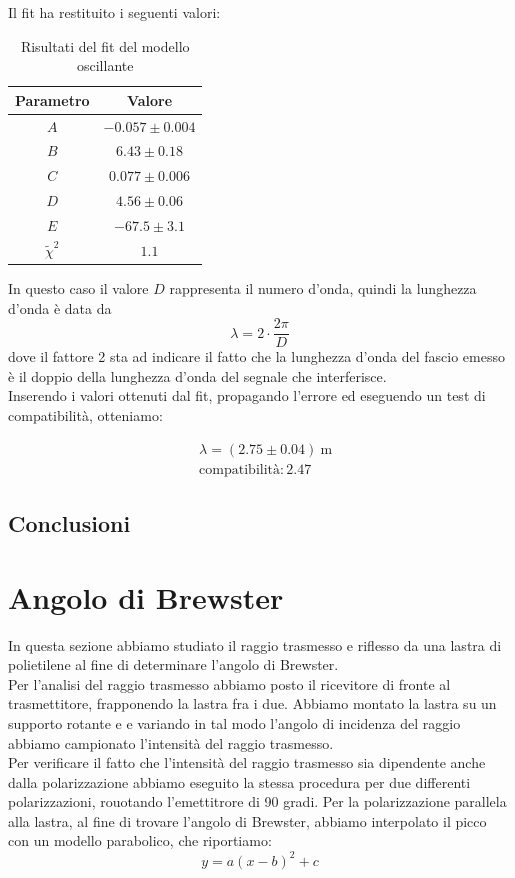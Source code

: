 \documentclass[letterpaper,12pt]{article}
\begin{document}
Il fit ha restituito i seguenti valori:
\begin{table}[h!]
	\centering
	\begin{tabular}{|c|c|}
		\hline
		Parametro & Valore \\
		\hline
		$A$ & $-0.057 \pm 0.004$ \\
		$B$ & $6.43 \pm 0.18$ \\
		$C$ & $0.077 \pm 0.006$ \\
		$D$ & $4.56 \pm 0.06$ \\
		$E$ & $-67.5 \pm 3.1$ \\
		$\tilde\chi^2$ & $1.1$ \\
		\hline
	\end{tabular}
	\caption{Risultati del fit del modello oscillante}
	\label{tab:fit_distanza_ondulatori}
\end{table}

In questo caso il valore $D$ rappresenta il numero d'onda, quindi la lunghezza d'onda è data da
$$\lambda = 2\cdot \frac{2\pi}{D}$$
dove il fattore 2 sta ad indicare il fatto che la lunghezza d'onda del fascio emesso è il doppio della lunghezza d'onda del segnale che interferisce.\\
Inserendo i valori ottenuti dal fit, propagando l'errore ed eseguendo un test di compatibilità, otteniamo:

\begin{align*}
	 & \lambda = (2.75 \pm 0.04)\ \text{m} \\
	 & \text{compatibilità}: 2.47
\end{align*}

\subsection{Conclusioni}



\section{Angolo di Brewster}
In questa sezione abbiamo studiato il raggio trasmesso e riflesso da una lastra di polietilene al fine di determinare
l'angolo di Brewster.\\
Per l'analisi del raggio trasmesso abbiamo posto il ricevitore di fronte al trasmettitore, frapponendo la lastra
fra i due. Abbiamo montato la lastra su un supporto rotante e e variando in tal modo l'angolo di incidenza del raggio
abbiamo campionato l'intensità del raggio trasmesso.\\
Per verificare il fatto che l'intensità del raggio trasmesso sia dipendente anche dalla polarizzazione abbiamo
eseguito la stessa procedura per due differenti polarizzazioni, rouotando l'emettitrore di 90 gradi. Per la polarizzazione
parallela alla lastra, al fine di trovare l'angolo di Brewster, abbiamo interpolato il picco con un modello parabolico,
che riportiamo:
\begin{equation}
	y = a(x-b)^2 + c
	\label{eq:parabola}
\end{equation}
\\
\end{document}
